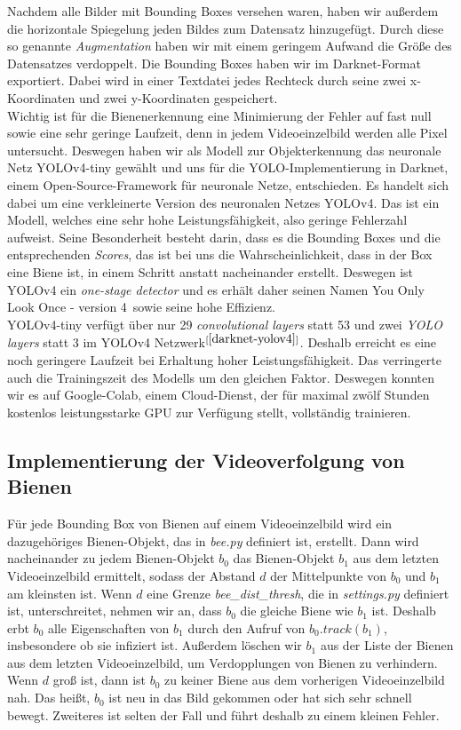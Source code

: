 \documentclass[11pt,a4paper]{article}
\newcommand{\bibRef}[1]{\hyperlink{#1}{$^{[\ref*{#1}{}]}$}}
\begin{document}
\noindent
Nachdem alle Bilder mit Bounding Boxes versehen waren, haben wir außerdem die horizontale Spiegelung jeden Bildes zum Datensatz hinzugefügt. Durch diese so genannte \textit{Augmentation} haben wir mit einem geringem Aufwand die Größe des Datensatzes verdoppelt. Die Bounding Boxes haben wir im Darknet-Format exportiert. Dabei wird in einer Textdatei jedes Rechteck durch seine zwei x-Koordinaten und zwei y-Koordinaten gespeichert.\\
Wichtig ist für die Bienenerkennung eine Minimierung der Fehler auf fast null sowie eine sehr geringe Laufzeit, denn in jedem Videoeinzelbild werden alle Pixel untersucht. Deswegen haben wir als Modell zur Objekterkennung das neuronale Netz YOLOv4-tiny gewählt und uns für die YOLO-Implementierung in Darknet, einem Open-Source-Framework für neuronale Netze, entschieden. Es handelt sich dabei um eine verkleinerte Version des neuronalen Netzes YOLOv4. Das ist ein Modell, welches eine sehr hohe Leistungsfähigkeit, also geringe Fehlerzahl aufweist. Seine Besonderheit besteht darin, dass es die Bounding Boxes und die entsprechenden \textit{Scores}, das ist bei uns die Wahrscheinlichkeit, dass in der Box eine Biene ist, in einem Schritt anstatt nacheinander erstellt. Deswegen ist YOLOv4 ein \textit{one-stage detector} und es erhält daher seinen Namen \glqq You Only Look Once - version 4\grqq \, sowie seine hohe Effizienz.\\
YOLOv4-tiny verfügt über nur 29 \textit{convolutional layers} statt 53 und zwei \textit{YOLO layers} statt 3 im YOLOv4 Netzwerk\bibRef{darknet-yolov4}. Deshalb erreicht es eine noch geringere Laufzeit bei Erhaltung hoher Leistungsfähigkeit. Das verringerte auch die Trainingszeit des Modells um den gleichen Faktor. Deswegen konnten wir es auf Google-Colab, einem Cloud-Dienst, der für maximal zwölf Stunden kostenlos leistungsstarke GPU zur Verfügung stellt, vollständig trainieren.\\
\subsection{Implementierung der Videoverfolgung von Bienen}
Für jede Bounding Box von Bienen auf einem Videoeinzelbild wird ein dazugehöriges Bienen-Objekt, das in \textit{bee.py} definiert ist, erstellt. Dann wird nacheinander zu jedem Bienen-Objekt $b_0$ das Bienen-Objekt $b_1$ aus dem letzten Videoeinzelbild ermittelt, sodass der Abstand $d$ der Mittelpunkte von $b_0$ und $b_1$ am kleinsten ist. Wenn $d$ eine Grenze \textit{bee\_dist\_thresh}, die in \textit{settings.py} definiert ist, unterschreitet, nehmen wir an, dass $b_0$ die gleiche Biene wie $b_1$ ist. Deshalb erbt $b_0$ alle Eigenschaften von $b_1$ durch den Aufruf von $b_0.track(b_1)$, insbesondere ob sie infiziert ist. Außerdem löschen wir $b_1$ aus der Liste der Bienen aus dem letzten Videoeinzelbild, um Verdopplungen von Bienen zu verhindern. Wenn $d$ groß ist, dann ist $b_0$ zu keiner Biene aus dem vorherigen Videoeinzelbild nah. Das heißt, $b_0$ ist neu in das Bild gekommen oder hat sich sehr schnell bewegt. Zweiteres ist selten der Fall und führt deshalb zu einem kleinen Fehler.
\end{document}
